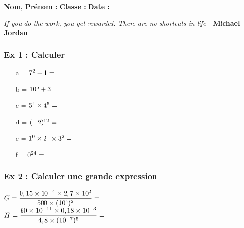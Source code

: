 \documentclass[10pt]{article}
\begin{document}

\newtheorem{Definition}{Définition}
\newtheorem{Theorem}{Théorème}
\newtheorem{Proposition}{Propriété}

\renewcommand{\labelitemi}{$\bullet$}
\renewcommand{\labelitemii}{$\circ$}

\setlength{\columnseprule}{1pt}

\textbf{Nom, Prénom :} \hspace{8cm} \textbf{Classe :} \hspace{3cm} \textbf{Date :}\\

\begin{center}
  \textit{If you do the work, you get rewarded. There are no shortcuts in life}  - \textbf{Michael Jordan}
\end{center}

\subsubsection*{Ex 1 : Calculer}

\begin{multicols}{3}
  \begin{itemize}
  \item[a =] $7^2 + 1 =  \dotfill $
  \item[b =] $10^5+3 =  \dotfill $
  \item[c =] $5^4 \times 4^5 =  \dotfill $
  \item[d =] $(-2)^{12} =  \dotfill $
  \item[e =] $1^0 \times 2^1 \times 3^2 =  \dotfill $
  \item[f =] $0^{24} =  \dotfill $
  \end{itemize}

\end{multicols}

\subsubsection*{Ex 2 : Calculer une grande expression }


\begin{multicols}{2}

  $G = \dfrac{0,15 \times 10^{-4} \times 2,7 \times 10^{2}}{500 \times (10^5)^2} =  \dotfill $\\
  $H = \dfrac{60 \times 10^{-11} \times 0,18 \times 10^{-3}}{4,8 \times (10^{-7})^5} =  \dotfill $ 

\end{multicols}
\end{document}
